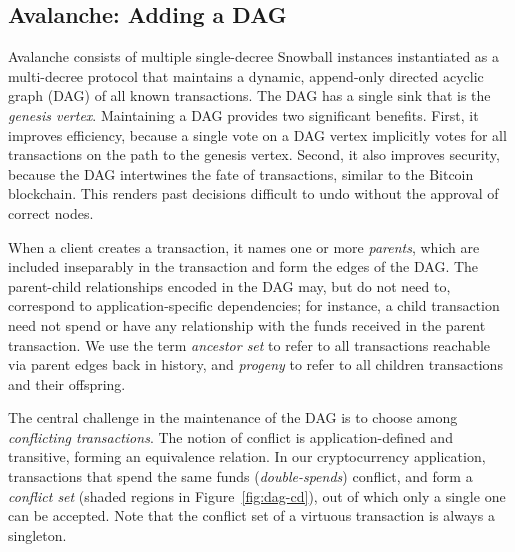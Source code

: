 \subsection{Avalanche: Adding a DAG}%

Avalanche consists of multiple single-decree Snowball instances instantiated as a multi-decree protocol that
maintains a dynamic, append-only directed acyclic graph (DAG) of all known transactions.
The DAG has a single sink that is the \emph{genesis vertex}.
Maintaining a DAG provides two significant benefits.
First, it improves efficiency, because a single vote on a DAG vertex implicitly votes for all transactions on the path to the genesis vertex.
Second, it also improves security, because the DAG intertwines the fate of transactions, similar to the Bitcoin blockchain.
This renders past decisions difficult to undo without the approval of correct nodes.


When a client creates a transaction, it names one or more \emph{parents}, which are included inseparably in the transaction and form the edges of the DAG\@.
The parent-child relationships encoded in the DAG may, but do not need to, correspond to application-specific dependencies; for instance, a child transaction need not spend or have any relationship with the funds received in the parent transaction.
We use the term \emph{ancestor set} to refer to all transactions reachable via parent edges back in history, and \emph{progeny} to refer to all children transactions and their offspring.

The central challenge in the maintenance of the DAG is to choose among \emph{conflicting transactions}.
The notion of conflict is application-defined and transitive, forming an equivalence relation.
In our cryptocurrency application, transactions that spend the same funds (\emph{double-spends}) conflict, and form a \emph{conflict set}
(shaded regions in Figure~\ref{fig:dag-cd}), out of which only a single one can be accepted.
Note that the conflict set of a virtuous transaction is always a singleton.
 

